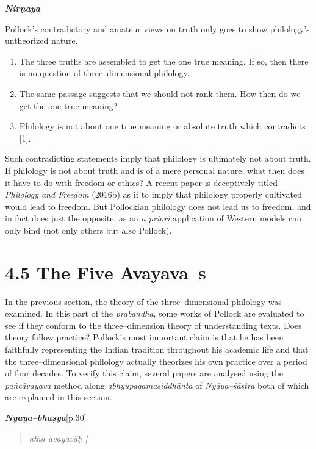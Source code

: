 \textit{\textbf{Nirṇaya}}

Pollock’s contradictory and amateur views on truth only goes to show philology’s untheorized nature.

\begin{enumerate}
\item The three truths are assembled to get the one true meaning. If so, then there is no question of three–dimensional philology.

 \item The same passage suggests that we should not rank them. How then do we get the one true meaning?

 \item Philology is not about one true meaning or absolute truth which contradicts [1].

\end{enumerate}

Such contradicting statements imply that philology is ultimately not about truth. If philology is not about truth and is of a mere personal nature, what then does it have to do with freedom or ethics? A recent paper is deceptively titled \textit{Philology and Freedom} (2016b) as if to imply that philology properly cultivated would lead to freedom. But Pollockian philology does not lead us to freedom, and in fact does just the opposite, as an \textit{a priori} application of Western models can only bind (not only others but also Pollock).


\section*{4.5 The Five Avayava–s}

In the previous section, the theory of the three–dimensional philology was examined. In this part of the \textit{prabandha}, some works of Pollock are evaluated to see if they conform to the three–dimension theory of understanding texts. Does theory follow practice? Pollock’s most important claim is that he has been faithfully representing the Indian tradition throughout his academic life and that the three–dimensional philology actually theorizes his own practice over a period of four decades. To verify this claim, several papers are analysed using the \textit{pañcāvayava} method along \textit{abhyupagamasiddhānta} of \textit{Nyāya–śāstra} both of which are explained in this section.

\textit{\textbf{Nyāya–bhāṣya}}[p.30]

\begin{verse}
\textit{atha avayavāḥ |}
\end{verse}

